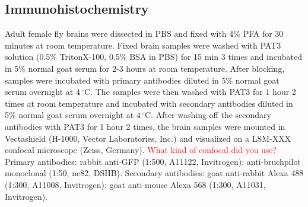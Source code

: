 \subsection*{Immunohistochemistry}

Adult female fly brains were dissected in PBS and fixed with 4\% PFA for 30 minutes at room temperature.
Fixed brain samples were washed with PAT3 solution (0.5\% TritonX-100, 0.5\% BSA in PBS) for 15 min 3 times and incubated in 5\% normal goat serum for 2-3 hours at room temperature.
After blocking, samples were incubated with primary antibodies diluted in 5\% normal goat serum overnight at $4\,^{\circ}\mathrm{C}$.
The samples were then washed with PAT3 for 1 hour 2 times at room temperature and incubated with secondary antibodies diluted in 5\% normal goat serum overnight at $4\,^{\circ}\mathrm{C}$.
After washing off the secondary antibodies with PAT3 for 1 hour 2 times, the brain samples were mounted in Vectashield (H-1000, Vector Laboratories, Inc.) and visualized on a LSM-XXX confocal microscope (Zeiss, Germany). \textcolor{red}{What kind of confocal did you use?}
Primary antibodies: rabbit anti-GFP (1:500, A11122, Invitrogen); anti-bruchpilot monoclonal (1:50, nc82, DSHB).
Secondary antibodies: goat anti-rabbit Alexa 488 (1:300, A11008, Invitrogen); goat anti-mouse Alexa 568 (1:300, A11031, Invitrogen).